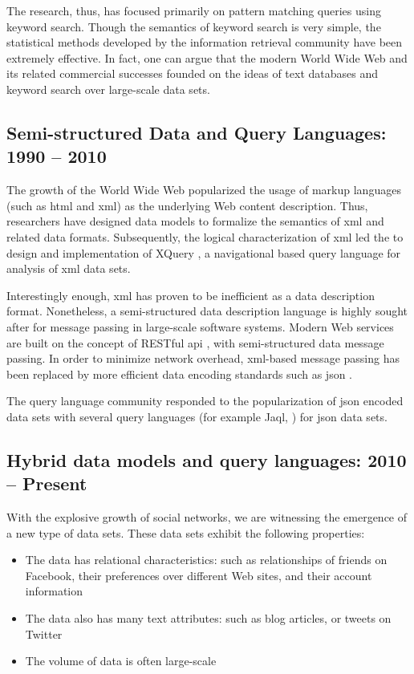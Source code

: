 		The research, thus, has focused primarily on pattern matching queries using keyword search.  Though the semantics of keyword search is very simple, the statistical methods developed by the information retrieval community \cite{salton-88, robertson-09, dumais-88} have been extremely effective.  In fact, one can argue that the modern World Wide Web and its related commercial successes founded on the ideas of text databases and keyword search over large-scale data sets.
		
	\subsection{Semi-structured Data and Query Languages:  1990 -- 2010}
		The growth of the World Wide Web popularized the usage of markup languages (such as \gls{html} and \gls{xml}) as the underlying Web content description.  Thus, researchers have designed data models \cite{suciu-98} to formalize the semantics of \gls{xml} and related data formats.  Subsequently, the logical characterization of \gls{xml} led the to design and implementation of XQuery \cite{xquery-10}, a navigational based query language for analysis of \gls{xml} data sets.
		
		Interestingly enough, \gls{xml} has proven to be inefficient as a data description format.  Nonetheless, a semi-structured data description language is highly sought after for message passing in large-scale software systems.  Modern Web services are built on the concept of RESTful \gls{api} \cite{restful-11}, with semi-structured data message passing.  In order to minimize network overhead, \gls{xml}-based message passing has been replaced by more efficient data encoding standards such as \gls{json} \cite{json}.
		
		The query language community responded to the popularization of \gls{json} encoded data sets with several query languages \cite{simeon-13} (for example Jaql, \cite{ibm-jaql}) for \gls{json} data sets.
	
	\subsection{Hybrid data models and query languages: 2010 -- Present}
		With the explosive growth of social networks, we are witnessing the emergence of a new type of data sets.  These data sets exhibit the following properties:
		
		\begin{itemize}
			\item The data has relational characteristics: such as relationships of friends on Facebook, their preferences over different Web sites, and their account information
			\item The data also has many text attributes: such as blog articles, or tweets on Twitter
			\item The volume of data is often large-scale
		\end{itemize}
		
